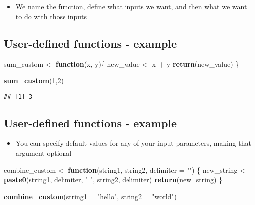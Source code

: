 \documentclass[]{article}
\newenvironment{Shaded}{\begin{snugshade}}{\end{snugshade}}
\newcommand{\KeywordTok}[1]{\textcolor[rgb]{0.13,0.29,0.53}{\textbf{#1}}}
\newcommand{\DataTypeTok}[1]{\textcolor[rgb]{0.13,0.29,0.53}{#1}}
\newcommand{\DecValTok}[1]{\textcolor[rgb]{0.00,0.00,0.81}{#1}}
\newcommand{\StringTok}[1]{\textcolor[rgb]{0.31,0.60,0.02}{#1}}
\newcommand{\ControlFlowTok}[1]{\textcolor[rgb]{0.13,0.29,0.53}{\textbf{#1}}}
\newcommand{\OperatorTok}[1]{\textcolor[rgb]{0.81,0.36,0.00}{\textbf{#1}}}
\newcommand{\NormalTok}[1]{#1}
\providecommand{\tightlist}{%
  \setlength{\itemsep}{0pt}\setlength{\parskip}{0pt}}
\begin{document}
\begin{itemize}
\tightlist
\item
  We name the function, define what inputs we want, and then what we
  want to do with those inputs
\end{itemize}

\subsection{User-defined functions -
example}\label{user-defined-functions---example}

\begin{Shaded}
\begin{Highlighting}[]
\NormalTok{sum_custom <-}\StringTok{ }\ControlFlowTok{function}\NormalTok{(x, y)\{}
\NormalTok{  new_value <-}\StringTok{ }\NormalTok{x }\OperatorTok{+}\StringTok{ }\NormalTok{y}
  \KeywordTok{return}\NormalTok{(new_value)}
\NormalTok{\}}

\KeywordTok{sum_custom}\NormalTok{(}\DecValTok{1}\NormalTok{,}\DecValTok{2}\NormalTok{)}
\end{Highlighting}
\end{Shaded}

\begin{verbatim}
## [1] 3
\end{verbatim}

\subsection{User-defined functions -
example}\label{user-defined-functions---example-1}

\begin{itemize}
\tightlist
\item
  You can specify default values for any of your input parameters,
  making that argument optional
\end{itemize}

\begin{Shaded}
\begin{Highlighting}[]
\NormalTok{combine_custom <-}\StringTok{ }\ControlFlowTok{function}\NormalTok{(string1, string2, }\DataTypeTok{delimiter =} \StringTok{""}\NormalTok{) \{}
\NormalTok{  new_string <-}\StringTok{ }\KeywordTok{paste0}\NormalTok{(string1, delimiter, }\StringTok{" "}\NormalTok{, string2, delimiter)}
  \KeywordTok{return}\NormalTok{(new_string)}
\NormalTok{\}}

\KeywordTok{combine_custom}\NormalTok{(}\DataTypeTok{string1 =} \StringTok{"hello"}\NormalTok{, }\DataTypeTok{string2 =} \StringTok{"world"}\NormalTok{)}
\end{Highlighting}
\end{Shaded}
\end{document}
